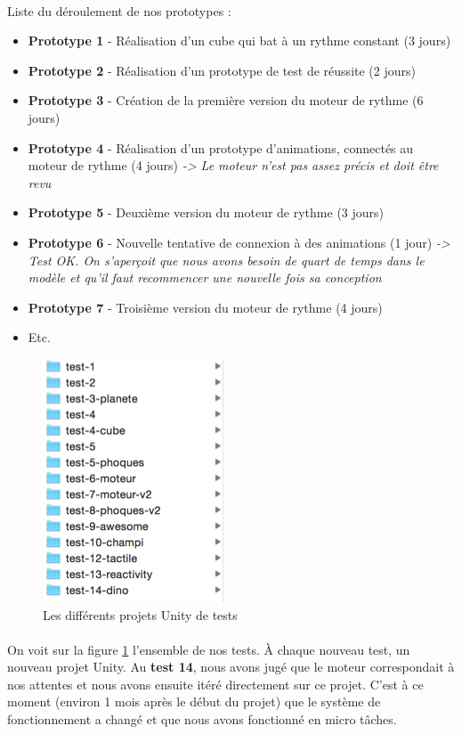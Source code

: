 \paragraph{}
Liste du déroulement de nos prototypes :

\begin{itemize}
\item \textbf{Prototype 1} - Réalisation d’un cube qui bat à un rythme constant (3 jours)
\item \textbf{Prototype 2} - Réalisation d’un prototype de test de réussite (2 jours)
\item \textbf{Prototype 3} - Création de la première version du moteur de rythme (6 jours)
\item \textbf{Prototype 4} - Réalisation d’un prototype d’animations, connectés au moteur de rythme (4 jours) \emph{-> Le moteur n’est pas assez précis et doit être revu}
\item \textbf{Prototype 5} - Deuxième version du moteur de rythme (3 jours)
\item \textbf{Prototype 6} - Nouvelle tentative de connexion à des animations (1 jour) \emph{-> Test OK. On s’aperçoit que nous avons besoin de quart de temps dans le modèle et qu’il faut recommencer une nouvelle fois sa conception}
\item \textbf{Prototype 7} - Troisième version du moteur de rythme (4 jours)
\item Etc.
\end{itemize}
 
\begin{figure}[H]\centering
  \includegraphics[scale=1]{./img/list-tests.png}
  \caption{Les différents projets Unity de tests}
  \label{listte}
\end{figure}
 
\paragraph{}
On voit sur la figure \ref{listte} l'ensemble de nos tests. À chaque nouveau test, un nouveau projet Unity. Au \textbf{test 14}, nous avons jugé que le moteur correspondait à nos attentes et nous avons ensuite itéré directement sur ce projet. C’est à ce moment (environ 1 mois après le début du projet) que le système de fonctionnement a changé et que nous avons fonctionné en micro tâches.
 
